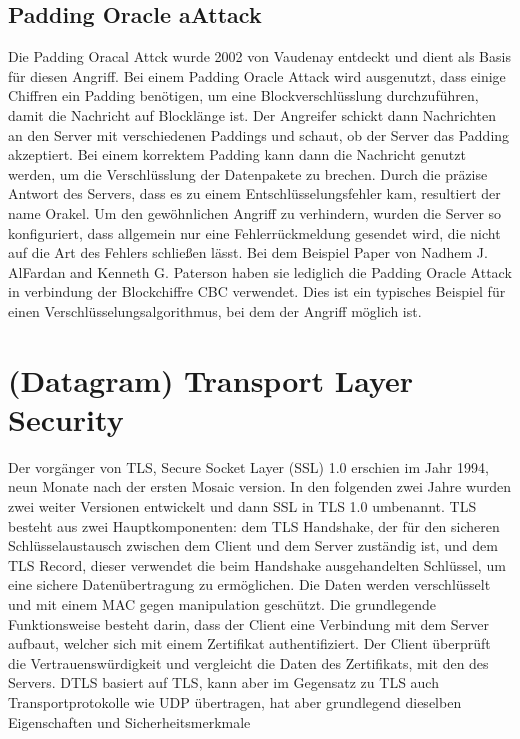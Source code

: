 \documentclass[a4paper,10pt]{scrartcl}
\begin{document}
    \subsection{Padding Oracle aAttack}\label{subsec:padding-oracle-attack}
    Die Padding Oracal Attck wurde 2002 von Vaudenay entdeckt und dient als Basis für diesen Angriff.
    Bei einem Padding Oracle Attack wird ausgenutzt, dass einige Chiffren ein Padding benötigen, um eine Blockverschlüsslung durchzuführen, damit die Nachricht auf Blocklänge ist.
    Der Angreifer schickt dann Nachrichten an den Server mit verschiedenen Paddings und schaut, ob der Server das Padding akzeptiert.
    Bei einem korrektem Padding kann dann die Nachricht genutzt werden, um die Verschlüsslung der Datenpakete zu brechen.
    Durch die präzise Antwort des Servers, dass es zu einem Entschlüsselungsfehler kam, resultiert der name Orakel\cite{Rizzo2010}.
    Um den gewöhnlichen Angriff zu verhindern, wurden die Server so konfiguriert, dass allgemein nur eine Fehlerrückmeldung gesendet wird, die nicht auf die Art des Fehlers schließen lässt.
    \newline
    Bei dem Beispiel Paper von Nadhem J. AlFardan and Kenneth G. Paterson haben sie lediglich die Padding Oracle Attack in verbindung der Blockchiffre CBC verwendet.
    Dies ist ein typisches Beispiel für einen Verschlüsselungsalgorithmus, bei dem der Angriff möglich ist.


    \section{(Datagram) Transport Layer Security}\label{sec:(d)tls}
    Der vorgänger von TLS, Secure Socket Layer (SSL) 1.0 erschien im Jahr 1994, neun Monate nach der ersten Mosaic version.
    In den folgenden zwei Jahre wurden zwei weiter Versionen entwickelt und dann SSL in TLS 1.0 umbenannt.
    \newline
    TLS besteht aus zwei Hauptkomponenten: dem TLS Handshake, der für den sicheren Schlüsselaustausch zwischen dem Client und dem Server zuständig ist,
    und dem TLS Record, dieser verwendet die beim Handshake ausgehandelten Schlüssel, um eine sichere Datenübertragung zu ermöglichen.
    Die Daten werden verschlüsselt und mit einem MAC gegen manipulation geschützt.
    Die grundlegende Funktionsweise besteht darin, dass der Client eine Verbindung mit dem Server aufbaut, welcher sich mit einem Zertifikat authentifiziert.
    Der Client überprüft die Vertrauenswürdigkeit und vergleicht die Daten des Zertifikats, mit den des Servers.
    \newline
    DTLS basiert auf TLS, kann aber im Gegensatz zu TLS auch Transportprotokolle wie UDP übertragen, hat aber grundlegend dieselben Eigenschaften und Sicherheitsmerkmale
\end{document}
